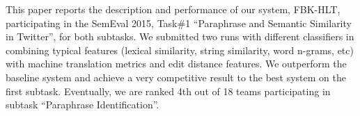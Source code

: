 This paper reports the description and performance of our system, FBK-HLT, participating in the SemEval 2015, Task\#1 ``Paraphrase and Semantic Similarity in Twitter'', for both subtasks. We submitted two runs with different classifiers in combining typical features (lexical similarity, string similarity, word n-grams, etc) with machine translation metrics and edit distance features. We outperform the baseline system and achieve a very competitive result to the best system on the first subtask. Eventually, we are ranked 4th out of 18 teams participating in subtask ``Paraphrase Identification''.
